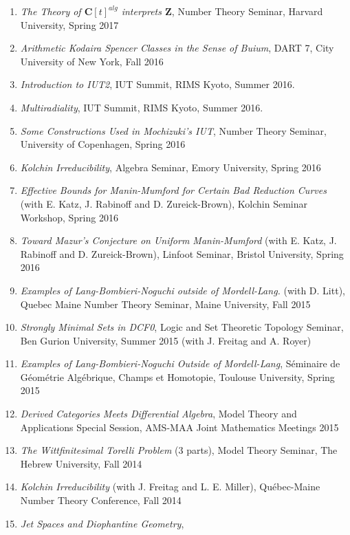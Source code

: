 \documentclass[a4paper,10pt]{article}
\newcommand{\CC}{\mathbf{C}}
\newcommand{\ZZ}{\mathbf{Z}}
\begin{document}
\begin{enumerate}
	\item \emph{The Theory of $\CC[t]^{alg}$ interprets $\ZZ$}, Number Theory Seminar, Harvard University, Spring 2017
	\item \emph{Arithmetic Kodaira Spencer Classes in the Sense of Buium}, DART 7, City University of New York, Fall 2016 
	\item \emph{Introduction to IUT2}, IUT Summit, RIMS Kyoto, Summer 2016.
	\item \emph{Multiradiality},  IUT Summit, RIMS Kyoto, Summer 2016. 
	\item \emph{Some Constructions Used in Mochizuki's IUT},  Number Theory Seminar, University of Copenhagen,  Spring 2016
	\item \emph{Kolchin Irreducibility}, Algebra Seminar, Emory University, Spring 2016 
	\item \emph{Effective Bounds for Manin-Mumford for Certain Bad Reduction Curves} (with E. Katz, J. Rabinoff and D. Zureick-Brown), Kolchin Seminar Workshop, Spring 2016
	\item \emph{Toward Mazur's Conjecture on Uniform Manin-Mumford} (with E. Katz, J. Rabinoff and D. Zureick-Brown), Linfoot Seminar, Bristol University, Spring 2016
	\item \emph{Examples of Lang-Bombieri-Noguchi outside of Mordell-Lang.} (with D. Litt),  Quebec Maine Number Theory Seminar, Maine University, Fall 2015
	\item \emph{Strongly Minimal Sets in DCF0},  Logic and Set Theoretic Topology Seminar, Ben Gurion University, Summer 2015 (with J. Freitag and A. Royer)
	\item \emph{Examples of Lang-Bombieri-Noguchi Outside of Mordell-Lang}, S\'eminaire de G\'eom\'etrie Alg\'ebrique, Champs et Homotopie, Toulouse University, Spring 2015
	\item \emph{Derived Categories Meets Differential Algebra}, Model Theory and Applications Special Session, AMS-MAA Joint Mathematics Meetings 2015
	\item \emph{The Wittfinitesimal Torelli Problem} (3 parts), Model Theory Seminar, The Hebrew University, Fall 2014
	\item \emph{Kolchin Irreducibility} (with J. Freitag and L. E. Miller),
	Qu\'{e}bec-Maine Number Theory Conference, Fall 2014
	\item \emph{Jet Spaces and Diophantine Geometry},

\end{enumerate}
\end{document}
